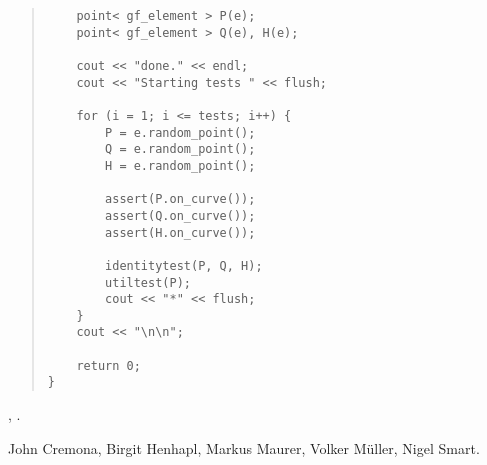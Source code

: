 \begin{quote}
\begin{verbatim}
    point< gf_element > P(e);
    point< gf_element > Q(e), H(e);

    cout << "done." << endl;
    cout << "Starting tests " << flush;

    for (i = 1; i <= tests; i++) {
        P = e.random_point();
        Q = e.random_point();
        H = e.random_point();

        assert(P.on_curve());
        assert(Q.on_curve());
        assert(H.on_curve());

        identitytest(P, Q, H);
        utiltest(P);
        cout << "*" << flush;
    }
    cout << "\n\n";

    return 0;
}
\end{verbatim}
\end{quote}



\SEEALSO

,
.



\NOTES



\AUTHOR

John Cremona, Birgit Henhapl, Markus Maurer, Volker M\"uller, Nigel Smart.

